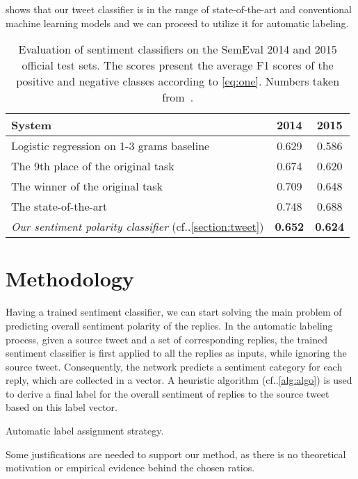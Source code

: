 \documentclass[conference]{IEEEtran}
\makeatletter
\DeclareRobustCommand\onedot{\futurelet\@let@token\@onedot}
\def\@onedot{\ifx\@let@token.\else.\null\fi\xspace}
\newcommand{\cf}{cf\onedot}
\makeatother
\begin{document}
 shows that our tweet classifier is in the range of state-of-the-art and conventional machine learning models and we can proceed to utilize it for automatic labeling. 

\begin{table}[t]
\centering
\caption{Evaluation of sentiment classifiers on the SemEval 2014 and 2015 official test sets.
The scores present the average F1 scores of the positive and negative classes according to \cref{eq:one}. 
Numbers taken from~\protect\cite{cliche-2017-bb,rosenthal2019semeval2014,rosenthal2019semeval2015}.}
\label{tab:semval_results}
\begin{tabular}{lcc} 
\toprule
\textbf{System} & \textbf{2014} & \textbf{2015} \\
\midrule
Logistic regression on 1-3 grams baseline & 0.629 & 0.586 \\
The 9th place of the original task & 0.674 & 0.620 \\
The winner of the original task & 0.709 & 0.648 \\
The state-of-the-art & 0.748 & 0.688 \\
\emph{Our sentiment polarity classifier} (\cf\cref{section:tweet}) & \textbf{0.652} & \textbf{0.624} \\
\bottomrule
\end{tabular}
\end{table}



\section{Methodology}
\label{section:Methodology}

Having a trained sentiment classifier, we can start solving the main problem of predicting overall sentiment polarity of the replies.
In the automatic labeling process, given a source tweet and a set of corresponding replies, the trained sentiment classifier is first applied to all the replies as inputs, while ignoring the source tweet. Consequently, the network predicts a sentiment category for each reply, which are collected in a vector.
A heuristic algorithm (\cf\cref{alg:algo}) is used to derive a final label for the overall sentiment of replies to the source tweet based on this label vector.
\begin{algorithm}[t]
\caption{Automatic label assignment strategy.}
\label{alg:algo}
\end{algorithm}
Some justifications are needed to support our method, as there is no theoretical motivation or empirical evidence behind the chosen ratios. 
\end{document}
